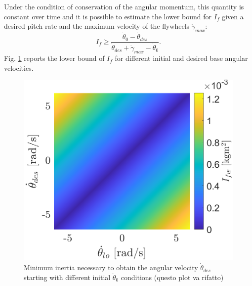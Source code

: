 \documentclass[journal,letterpaper]{IEEEtran}
\begin{document}
Under the condition of conservation of the angular momentum, this quantity is constant over time and it is possible to estimate the lower bound for $I_{f}$ given a desired pitch rate and the maximum velocity of the flywheels $\dot{\gamma}_{max}$:
\begin{equation}
I_{f} \geq \dfrac{\dot{\theta}_0-\dot{\theta}_{des}}{\dot{\theta}_{des}+\dot{\gamma}_{max}-\dot{\theta}_0}.
\end{equation}
Fig. \ref{fig:inertia_limits} reports the lower bound of $I_{f}$ for different initial and desired base angular velocities.
\begin{figure}
	\centering
	\includegraphics[width=.7\linewidth]{figures/inertia_limits.eps}
	\caption{Minimum inertia necessary to obtain the angular velocity $\dot{\theta}_{des}$ starting with different initial $\dot{\theta}_0$ conditions (questo plot va rifatto)}
	\label{fig:inertia_limits}
\end{figure}
\end{document}
